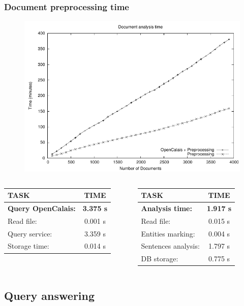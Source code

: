 \documentclass{beamer}
\begin{document}
\begin{frame}
\frametitle{Document preprocessing time}
\begin{figure}
\includegraphics[scale=0.6]{imgs/analysis_time}
\end{figure}
\begin{columns}[T]
\centering
\tiny
\begin{tabular}{l|c}
TASK & TIME \\
\hline
\bf{Query OpenCalais:} & \bf{3.375 s}\\
\;\;Read file: & 0.001 s\\
\;\;Query service: & 3.359 s\\
\;\;Storage time: & 0.014 s\\
\end{tabular}
\centering
\tiny
\begin{tabular}{l|c}
TASK & TIME \\
\hline
\bf{Analysis time:} & \bf{1.917 s}\\
\;\;Read file: & 0.015 s\\
\;\;Entities marking: & 0.004 s\\
\;\;Sentences analysis: & 1.797 s\\
\;\;DB storage: & 0.775 s\\
\end{tabular}
\end{columns}
\bigskip
\end{frame}

\subsection{Query answering}
\end{document}
